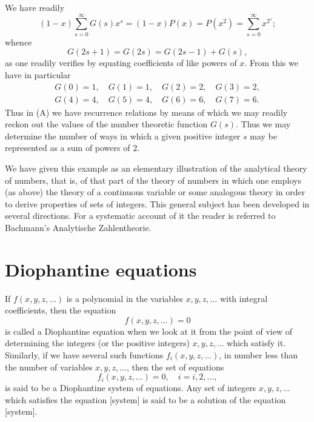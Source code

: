 \documentclass[oneside]{book}
\begin{document}
We have readily
\begin{equation*}
(1-x)\sum_{s=0}^\infty G(s) x^s = (1-x)P(x) = P(x^2) =
    \sum_{s=0}^\infty x^{2^s};
\end{equation*}
whence
\begin{equation}
G(2s + 1) = G(2s) = G(2s - 1) + G(s), \tag{A}
\end{equation}
as one readily verifies by equating coefficients of like powers of
$x$. From this we have in particular
\begin{gather*}
G(0) = 1, \quad G(1) = 1, \quad G(2) = 2, \quad G(3) = 2, \\
G(4) = 4, \quad G(5) = 4, \quad G(6) = 6, \quad G(7) = 6.
\end{gather*}
Thus in (A) we have recurrence relations by means of which we may
readily reckon out the values of the number theoretic function
$G(s)$. Thus we may determine the number of ways in which a given
positive integer $s$ may be represented as a sum of powers of $2$.

We have given this example as an elementary illustration of the
analytical theory of numbers, that is, of that part of the theory of
numbers in which one employs (as above) the theory of a continuous
variable or some analogous theory in order to derive properties of
sets of integers. This general subject has been developed in several
directions. For a systematic account of it the reader is referred to
Bachmann's Analytische Zahlentheorie.%

\section{Diophantine equations}\label{s45}%

If $f(x, y, z, \ldots)$ is a polynomial in the variables $x, y, z,
\ldots$ with integral coefficients, then the equation
\begin{equation*}
f(x, y, z, \ldots) = 0
\end{equation*}
is called a Diophantine equation when we look at it from the point
of view of determining the integers (or the positive integers) $x,
y, z, \ldots$ which satisfy it. Similarly, if we have several such
functions $f_i(x, y, z, \ldots)$, in number less than the number of
variables $x, y, z, \ldots$, then the set of equations
\begin{equation*}
f_i(x, y, z, \ldots) = 0,\quad  i = i, 2, \ldots,
\end{equation*}
is said to be a Diophantine system of equations. Any set of integers
$x, y, z, \ldots$ which satisfies the equation [system] is said to
be a solution of the equation [system].
\end{document}
